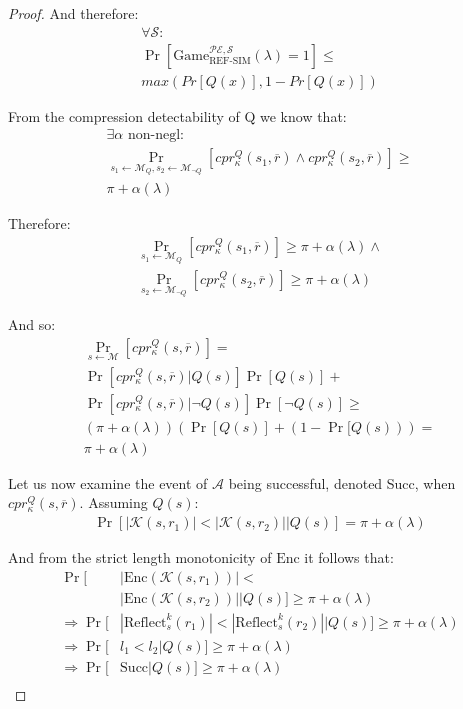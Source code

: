 \begin{proof}
And therefore:
\begin{align*}
    \forall \mathcal{S}:\\
    \Pr[
        \text{Game}_{\text{REF-SIM}}^{\mathcal{PE},\mathcal{S}}
        (\lambda) = 1
    ]
    \leq\\
    max(Pr[Q(x)], 1 - Pr[Q(x)])
\end{align*}

From the compression detectability of Q we know that:
\begin{align*}
    \exists \alpha \text{ non-negl}:\\
    \Pr_{s_1 \leftarrow \mathcal{M}_Q,
         s_2 \leftarrow \mathcal{M}_{\lnot Q}}
         [cpr^Q_{\kappa}(s_1, \overbar{r}) \land
          cpr^Q_{\kappa}(s_2, \overbar{r})]
    \geq\\
    \pi + \alpha(\lambda)
\end{align*}

Therefore:
\begin{align*}
    \Pr_{s_1 \leftarrow \mathcal{M}_Q}
         [cpr^Q_{\kappa}(s_1, \overbar{r})]
    \geq
    \pi + \alpha(\lambda) \land\\
    \Pr_{s_2 \leftarrow \mathcal{M}_{\lnot Q}}
         [cpr^Q_{\kappa}(s_2, \overbar{r})]
    \geq
    \pi + \alpha(\lambda)
\end{align*}

And so:
\begin{align*}
    \Pr_{s \leftarrow \mathcal{M}}
         [cpr^Q_{\kappa}(s, \overbar{r})]
    =\\
    \Pr[cpr^Q_{\kappa}(s, \overbar{r})|Q(s)]\Pr[Q(s)]
    +\\
    \Pr[cpr^Q_{\kappa}(s, \overbar{r})|\lnot Q(s)]\Pr[\lnot Q(s)]
    \geq\\
    (\pi + \alpha(\lambda))(\Pr[Q(s)] + (1 - \Pr[Q(s)))
    =\\
    \pi + \alpha(\lambda)
\end{align*}

Let us now examine the event of $\mathcal{A}$ being successful, denoted Succ,
when $cpr^Q_{\kappa}(s, \overbar{r})$. Assuming $Q(s)$:
\begin{align*}
    \Pr[|\mathcal{K}(s, r_1)| < |\mathcal{K}(s, r_2)||Q(s)]
    = \pi + \alpha(\lambda)
\end{align*}

And from the strict length monotonicity of $\textrm{Enc}$ it follows that:
\begin{align*}
    \Pr[&|\textrm{Enc}(\mathcal{K}(s, r_1))| <\\&|\textrm{Enc}(\mathcal{K}(s, r_2))||Q(s)]
        \geq \pi + \alpha(\lambda)\\
    \Rightarrow \Pr[&
        |\text{Reflect}^{k}_s(r_1)|
        <
        |\text{Reflect}^{k}_s(r_2)||Q(s)
    ]
        \geq \pi + \alpha(\lambda)\\
    \Rightarrow \Pr[&l_1 < l_2|Q(s)]
        \geq \pi + \alpha(\lambda)\\
    \Rightarrow \Pr[&\text{Succ}|Q(s)]
        \geq \pi + \alpha(\lambda)\\
\end{align*}


\end{proof}
